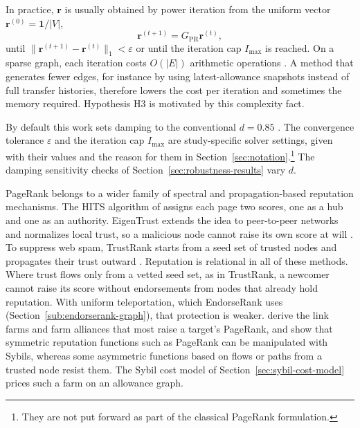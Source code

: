 
In practice, $\mathbf{r}$ is usually obtained by power iteration from the uniform vector $\mathbf{r}^{(0)}=\mathbf{1}/|V|$,
\begin{equation}
\mathbf{r}^{(t+1)} = G_{\mathrm{PR}}\mathbf{r}^{(t)},
\label{eq:power-iteration}
\end{equation}
until $\|\mathbf{r}^{(t+1)}-\mathbf{r}^{(t)}\|_1 < \varepsilon$ or until the iteration cap $I_{\max}$ is reached. On a sparse graph, each iteration costs $O(|E|)$ arithmetic operations \parencite{leskovec2020mining}. A method that generates fewer edges, for instance by using latest-allowance snapshots instead of full transfer histories, therefore lowers the cost per iteration and sometimes the memory required. Hypothesis H3 is motivated by this complexity fact.

By default this work sets damping to the conventional $d=0.85$ \parencite{page1999pagerank}. The convergence tolerance $\varepsilon$ and the iteration cap $I_{\max}$ are study-specific solver settings, given with their values and the reason for them in Section~\ref{sec:notation}.\footnote{They are not put forward as part of the classical PageRank formulation.} The damping sensitivity checks of Section~\ref{sec:robustness-results} vary $d$.


PageRank belongs to a wider family of spectral and propagation-based reputation mechanisms. The HITS algorithm of \textcite{kleinberg1999hits} assigns each page two scores, one as a hub and one as an authority. EigenTrust extends the idea to peer-to-peer networks and normalizes local trust, so a malicious node cannot raise its own score at will \parencite{kamvar2003eigentrust}. To suppress web spam, TrustRank starts from a seed set of trusted nodes and propagates their trust outward \parencite{gyongyi2004trustrank}. Reputation is relational in all of these methods. Where trust flows only from a vetted seed set, as in TrustRank, a newcomer cannot raise its score without endorsements from nodes that already hold reputation. With uniform teleportation, which EndorseRank uses (Section~\ref{sub:endorserank-graph}), that protection is weaker. \textcite{gyongyi2005alliances} derive the link farms and farm alliances that most raise a target's PageRank, and \textcite{cheng2005sybilproof} show that symmetric reputation functions such as PageRank can be manipulated with Sybils, whereas some asymmetric functions based on flows or paths from a trusted node resist them. The Sybil cost model of Section~\ref{sec:sybil-cost-model} prices such a farm on an allowance graph.

